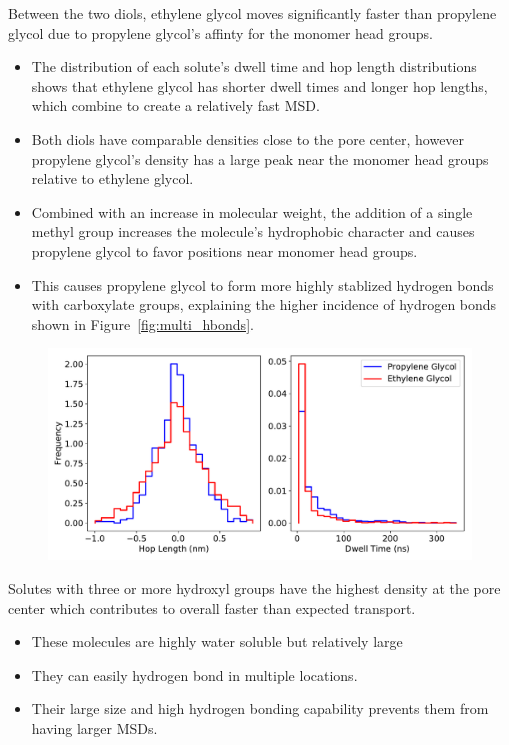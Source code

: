 \documentclass{article}
\begin{document}
  Between the two diols, ethylene glycol moves significantly faster than propylene glycol
  due to propylene glycol's affinty for the monomer head groups.  
  \begin{itemize}
  	\item The distribution of each solute's dwell time and hop length distributions shows that
  	ethylene glycol has shorter dwell times and longer hop lengths, which combine to create a 
  	relatively fast MSD. 
    \item Both diols have comparable densities close to the pore center, however propylene glycol's
    density has a large peak near the monomer head groups relative to ethylene glycol. 
    \item Combined with an increase in molecular weight, the addition of a single methyl group
    increases the molecule's hydrophobic character and causes propylene glycol to favor positions
    near monomer head groups.
    \item This causes propylene glycol to form more highly stablized hydrogen bonds with
    carboxylate groups, explaining the higher incidence of hydrogen bonds shown in Figure~\ref{fig:multi_hbonds}.
  \end{itemize}
  
  \begin{figure}[!htb]
  \centering
  \includegraphics[width=\linewidth]{dwell_hop_PG_GCL.pdf}
  \caption{}\label{fig:dwell_hop_PG_GCL}
  \end{figure}
  
  Solutes with three or more hydroxyl groups have the highest density
  at the pore center which contributes to overall faster than expected transport.
  \begin{itemize}
  	\item These molecules are highly water soluble but relatively large
  	\item They can easily hydrogen bond in multiple locations.
  	\item Their large size and high hydrogen bonding capability prevents them
  	from having larger MSDs.
  \end{itemize}
  
\end{document}
